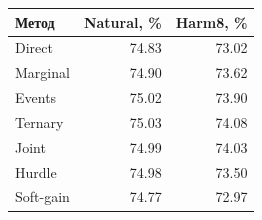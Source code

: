 \begin{tabular}{lrr}
\toprule
Метод & Natural, \% & Harm8, \% \\
\midrule
Direct & 74.83 & 73.02 \\
Marginal & 74.90 & 73.62 \\
Events & 75.02 & 73.90 \\
Ternary & 75.03 & 74.08 \\
Joint & 74.99 & 74.03 \\
Hurdle & 74.98 & 73.50 \\
Soft-gain & 74.77 & 72.97 \\
\bottomrule
\end{tabular}
